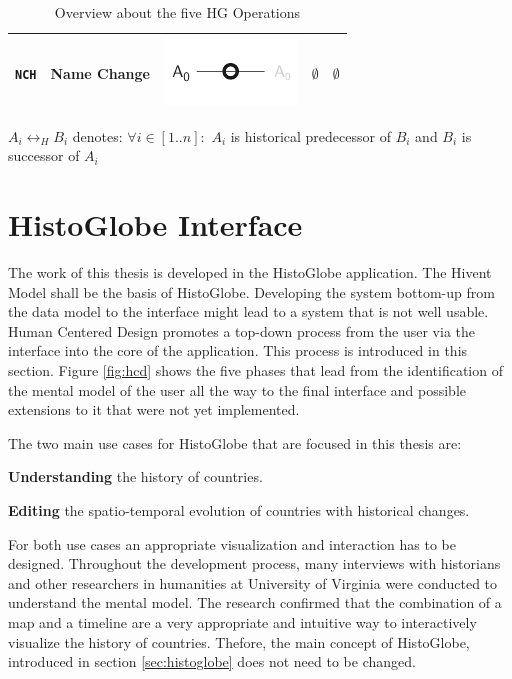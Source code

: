 \begin{table}[H]
\begin{center}
\begin{tabular}{m{0.75cm} m{2.5cm} m{2.5cm} m{2.0cm} m{2.5cm}}
  \midrule
  \texttt{NCH} & Name Change & \raisebox{-0.25\height}
  {\includegraphics{graphics/development/operations/NCH}} &
  $ \emptyset $ &
  $ \emptyset $ \\

  \bottomrule
\end{tabular}
\caption{Overview about the five HG Operations}
\small{$A_i \leftrightarrow_H B_i$ denotes: $\forall i \in [1..n]:$ $A_i$ is historical predecessor of $B_i$ and $B_i$ is successor of $A_i$}
\label{tab:historical_geographic_operations}
\end{center}
\end{table}



\section{HistoGlobe Interface} %
\label{sec:histoglobe_interface}

The work of this thesis is developed in the HistoGlobe application. The Hivent Model shall be the basis of HistoGlobe. Developing the system bottom-up from the data model to the interface might lead to a system that is not well usable. Human Centered Design promotes a top-down process from the user via the interface into the core of the application. This process is introduced in this section. Figure \ref{fig:hcd} shows the five phases that lead from the identification of the mental model of the user all the way to the final interface and possible extensions to it that were not yet implemented.

The two main use cases for HistoGlobe that are focused in this thesis are:
\begin{compactenum}
  \item \textbf{Understanding} the history of countries.
  \item \textbf{Editing} the spatio-temporal evolution of countries with historical changes.
\end{compactenum}

For both use cases an appropriate visualization and interaction has to be designed. Throughout the development process, many interviews with historians and other researchers in humanities at University of Virginia were conducted to understand the mental model. The research confirmed that the combination of a map and a timeline are a very appropriate and intuitive way to interactively visualize the history of countries. Thefore, the main concept of HistoGlobe, introduced in section \ref{sec:histoglobe} does not need to be changed.

